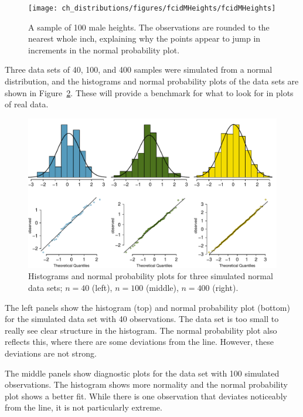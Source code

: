 \begin{figure}[ht]
\centering
\texttt{[image: ch\_distributions/figures/fcidMHeights/fcidMHeights]}
\caption{A sample of 100 male heights. The observations are rounded to the nearest whole inch, explaining why the points appear to jump in increments in the normal probability plot.}
\label{fcidMHeights}
\end{figure}

\begin{example}{Three data sets of 40, 100, and 400 samples were simulated from a normal distribution, and the histograms and normal probability plots of the data sets are shown in Figure~\ref{normalExamples}. These will provide a benchmark for what to look for in plots of real data.} \label{normalExamplesExample}

\begin{figure}
\centering
\includegraphics[width=\textwidth]{ch_distributions/figures/normalExamples/normalExamples}
\caption{Histograms and normal probability plots for three simulated normal data sets; $n=40$ (left), $n=100$ (middle), $n=400$ (right).}
\label{normalExamples}
\end{figure}

The left panels show the histogram (top) and normal probability plot (bottom) for the simulated data set with 40 observations. The data set is too small to really see clear structure in the histogram. The normal probability plot also reflects this, where there are some deviations from the line. However, these deviations are not strong.

The middle panels show diagnostic plots for the data set with 100 simulated observations. The histogram shows more normality and the normal probability plot shows a better fit. While there is one observation that deviates noticeably from the line, it is not particularly extreme.


\end{example}
